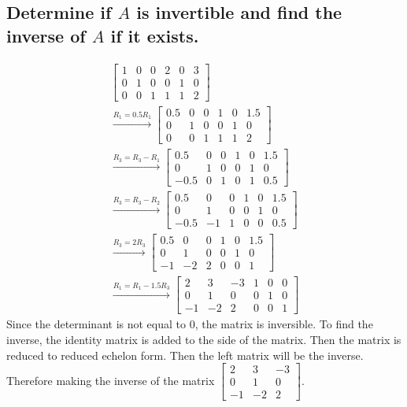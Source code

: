 \documentclass[12pt, a4paper]{article}
\begin{document}
		\subsection{Determine if $A$ is invertible and find the inverse of $A$ if it exists.}
			\begin{align*}
				\left[
					\begin{array}{ccc|ccc}
						1&0&0&2&0&3\\
						0&1&0&0&1&0\\
						0&0&1&1&1&2
					\end{array}
				\right]\\
				\xrightarrow{R_1=0.5R_1}\left[
					\begin{array}{ccc|ccc}
						0.5&0&0&1&0&1.5\\
						0&1&0&0&1&0\\
						0&0&1&1&1&2
					\end{array}
				\right]\\
				\xrightarrow{R_3=R_3-R_1}\left[
					\begin{array}{ccc|ccc}
						0.5&0&0&1&0&1.5\\
						0&1&0&0&1&0\\
						-0.5&0&1&0&1&0.5
					\end{array}
				\right]\\
				\xrightarrow{R_3=R_3-R_2}\left[
					\begin{array}{ccc|ccc}
						0.5&0&0&1&0&1.5\\
						0&1&0&0&1&0\\
						-0.5&-1&1&0&0&0.5
					\end{array}
				\right]\\
				\xrightarrow{R_3=2R_3}\left[
					\begin{array}{ccc|ccc}
						0.5&0&0&1&0&1.5\\
						0&1&0&0&1&0\\
						-1&-2&2&0&0&1
					\end{array}
				\right]\\
				\xrightarrow{R_1=R_1-1.5R_3}\left[
					\begin{array}{ccc|ccc}
						2&3&-3&1&0&0\\
						0&1&0&0&1&0\\
						-1&-2&2&0&0&1
					\end{array}
				\right]
			\end{align*}
			Since the determinant is not equal to 0, the matrix is inversible. To find the inverse, the identity matrix is added to the side of the matrix. Then the matrix is reduced to reduced echelon form. Then the left matrix will be the inverse. Therefore making the inverse of the matrix $\begin{bmatrix}2&3&-3\\0&1&0\\-1&-2&2\end{bmatrix}$.
\end{document}
